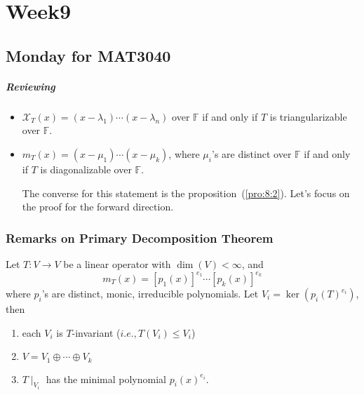 \chapter{Week9}
\section{Monday for MAT3040}
\paragraph{Reviewing}
\begin{itemize}
\item
$\mathcal{X}_T(x) = (x-\lambda_1)\cdots(x-\lambda_n)$ over $\mathbb{F}$ if and only if $T$ is triangularizable over $\mathbb{F}$.
\item
$m_T(x) = (x-\mu_1)\cdots(x-\mu_k)$, where $\mu_i$'s are distinct over $\mathbb{F}$ if and only if $T$ is diagonalizable over $\mathbb{F}$.

The converse for this statement is the proposition~(\ref{pro:8:2}). Let's focus on the proof for the forward direction.
\end{itemize}

\subsection{Remarks on Primary Decomposition Theorem}


\begin{theorem}
Let $T:V\to V$ be a linear operator 
with $\dim(V)<\infty$, and
\[
m_T(x) = [p_1(x)]^{e_1}\cdots[p_k(x)]^{e_k}
\]
where $p_i$'s are distinct, monic, irreducible polynomials.
Let $V_i=\ker(p_i(T)^{e_i})$, then
\begin{enumerate}
\item
each $V_i$ is $T$-invariant ($i.e., T(V_i)\le V_i$)
\item
$V=V_1\oplus\cdots\oplus V_k$
\item
$T\mid_{V_i}$ has the minimal polynomial $p_i(x)^{e_i}$.
\end{enumerate}
\end{theorem}

